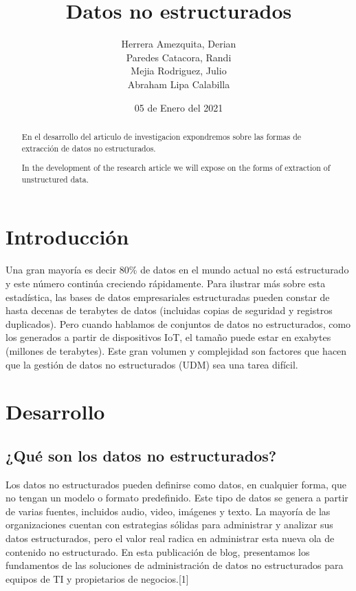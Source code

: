 \documentclass[twocolumn]{article}
\newenvironment{poliabstract}[1]
   {\renewcommand{\abstractname}{#1}\begin{abstract}}
   {\end{abstract}}
\begin{document}
\title{Datos no estructurados}
\author{Herrera Amezquita,
Derian  \\Paredes Catacora, Randi \\Mejia Rodriguez, Julio\\Abraham Lipa Calabilla}


\date{05 de Enero del 2021}

\maketitle

\begin{poliabstract}{Resumen} 
  En el desarrollo del articulo de investigacion expondremos sobre las formas de extracción de datos no estructurados.
  
\end{poliabstract}

\begin{poliabstract}{Abstract} 
  In the development of the research article we will expose on the forms of extraction of unstructured data.
\end{poliabstract}

\section{Introducción}
Una gran mayoría es decir 80\% de datos en el mundo actual no está estructurado y este número continúa 
creciendo rápidamente. Para ilustrar más sobre esta estadística, las bases de datos empresariales estructuradas
 pueden constar de hasta decenas de terabytes de datos (incluidas copias de seguridad y registros duplicados).
  Pero cuando hablamos de conjuntos de datos no estructurados, como los generados a partir de dispositivos IoT, 
  el tamaño puede estar en exabytes (millones de terabytes). Este gran volumen y complejidad son factores que 
  hacen que la gestión de datos no estructurados (UDM) sea una tarea difícil.

\section{Desarrollo}
\subsection{¿Qué son los datos no estructurados?}
Los datos no estructurados pueden definirse como datos, en cualquier forma, que no tengan un modelo o formato 
predefinido. Este tipo de datos se genera a partir de varias fuentes, incluidos audio, video, imágenes y texto.
La mayoría de las organizaciones cuentan con estrategias sólidas para administrar y analizar sus datos estructurados,
 pero el valor real radica en administrar esta nueva ola de contenido no estructurado. En esta publicación de blog, 
 presentamos los fundamentos de las soluciones de administración de datos no estructurados para equipos de TI y 
 propietarios de negocios.[1]
\end{document}
